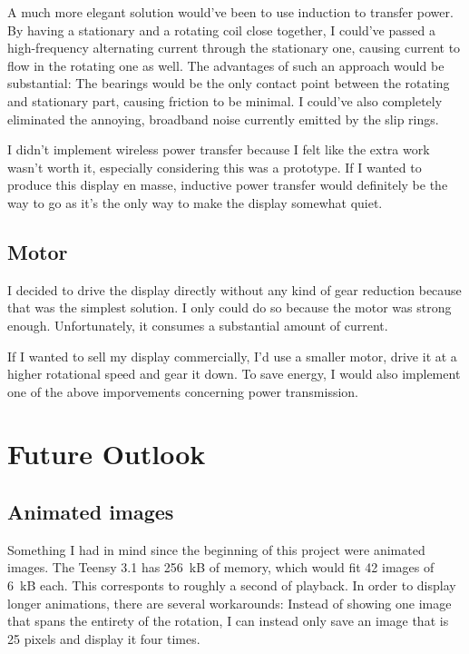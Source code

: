 \documentclass[a4paper, 11pt, titlepage]{report}
\begin{document}
A much more elegant solution would've been to use induction to transfer power. By having a
stationary and a rotating coil close together, I could've passed a high-frequency alternating
current through the stationary one, causing current to flow in the rotating one as well. The
advantages of such an approach would be substantial: The bearings would be the only contact point
between the rotating and stationary part, causing friction to be minimal. I could've also
completely eliminated the annoying, broadband noise currently emitted by the slip rings.

I didn't implement wireless power transfer because I felt like the extra work wasn't worth it,
especially considering this was a prototype. If I wanted to produce this display en masse,
inductive power transfer would definitely be the way to go as it's the only way to make the
display somewhat quiet.


\subsection{Motor}

I decided to drive the display directly without any kind of gear reduction because that was the
simplest solution. I only could do so because the motor was strong enough. Unfortunately, it
consumes a substantial amount of current.

If I wanted to sell my display commercially, I'd use a smaller motor, drive it at a higher
rotational speed and gear it down. To save energy, I would also implement one of the above
imporvements concerning power transmission.


\section{Future Outlook}

\subsection{Animated images}

Something I had in mind since the beginning of this project were animated images. The Teensy 3.1
has \SI{256}{kB} of memory, which would fit 42 images of \SI{6}{kB} each. This
corresponts to roughly a second of playback. In order to display longer animations, there are
several workarounds: Instead of showing one image that spans the entirety of the rotation, I can
instead only save an image that is 25 pixels and display it four times.
\end{document}
